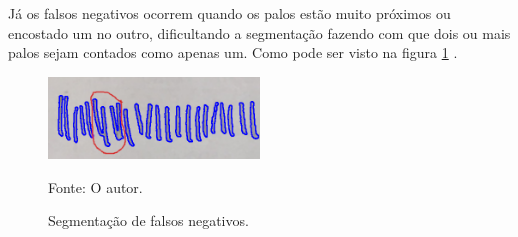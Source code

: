 Já os falsos negativos ocorrem quando os palos estão muito próximos ou encostado um no outro, dificultando a segmentação fazendo com que dois ou mais palos sejam contados como apenas um. Como pode ser visto na figura \ref{fig:palo-seg}  .

\begin{figure}[H]
 \centering
 \includegraphics[width=0.50\textwidth]{./fig/resultado-analise/seg-palos}
 \caption{Segmentação de falsos negativos.}
  Fonte: O autor.
 \label{fig:palo-seg}
\end{figure}


